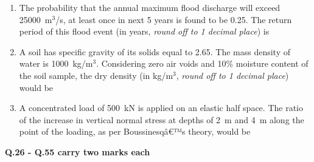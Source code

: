 \documentclass[12pt]{article}
\begin{document}
\begin{enumerate}[label=Q.\arabic*]
	\item The probability that the annual maximum flood discharge will exceed 25000~m$^3$/s, at least once in next 5 years is found to be 0.25. The return period of this flood event (in years, \textit{round off to 1 decimal place}) is \underline{\hspace{2cm}}



	\item A soil has specific gravity of its solids equal to 2.65. The mass density of water is 1000~kg/m$^3$. Considering zero air voids and 10\% moisture content of the soil sample, the dry density (in kg/m$^3$, \textit{round off to 1 decimal place}) would be \underline{\hspace{2cm}}



	\item A concentrated load of 500~kN is applied on an elastic half space. The ratio of the increase in vertical normal stress at depths of 2~m and 4~m along the point of the loading, as per Boussinesqâ€™s theory, would be \underline{\hspace{2cm}}
\end{enumerate}
\textbf{Q.26 - Q.55 carry two marks each }
\end{document}
